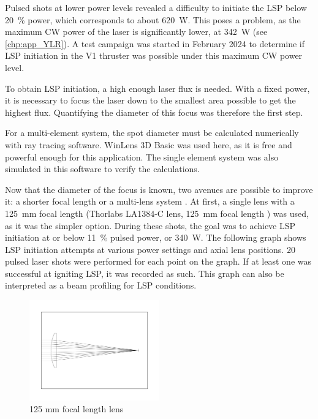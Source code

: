             Pulsed shots at lower power levels revealed a difficulty to initiate the LSP below \qty{20}{\%} power, which corresponds to about \qty{620}{W}. This poses a problem, as the maximum CW power of the laser is significantly lower, at \qty{342}{W} (see \autoref{chp:app_YLR}). A test campaign was started in February 2024 to determine if LSP initiation in the V1 thruster was possible under this maximum CW power level.
            
            To obtain LSP initiation, a high enough laser flux is needed. With a fixed power, it is necessary to focus the laser down to the smallest area possible to get the highest flux. Quantifying the diameter of this focus was therefore the first step. 


            For a multi-element system, the spot diameter must be calculated numerically with ray tracing software. WinLens 3D Basic was used here, as it is free and powerful enough for this application. The single element system was also simulated in this software to verify the calculations.

            Now that the diameter of the focus is known, two avenues are possible to improve it: a shorter focal length or a multi-lens system \cite{LensTutorial}. At first, a single lens with a \qty{125}{mm} focal length (Thorlabs LA1384-C lens, \qty{125}{mm} focal length ) was used, as it was the simpler option. During these shots, the goal was to achieve LSP initiation at or below \qty{11}{\%} pulsed power, or \qty{340}{W}. The following graph shows LSP initiation attempts at various power settings and axial lens positions. 20 pulsed laser shots were performed for each point on the graph. If at least one was successful at igniting LSP, it was recorded as such. This graph can also be interpreted as a beam profiling for LSP conditions.
            
            \begin{figure}[!ht]
                \centering
                \includegraphics[width=0.5\textwidth]{assets/4 experiments/125lens.pdf}
                \caption{125 mm focal length lens}
            \end{figure}

